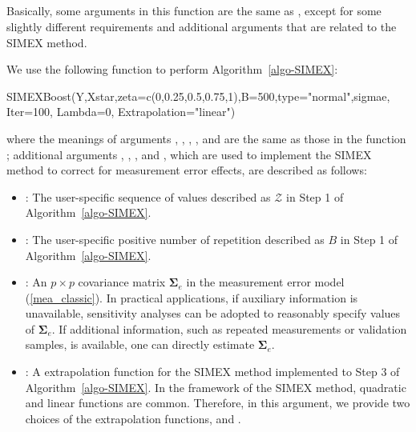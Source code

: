 
\subsection*{}

Basically, some arguments in this function are the same as , except for some slightly different requirements and additional arguments that are related to the SIMEX method.

We use the following function to perform Algorithm~\ref{algo-SIMEX}:
\begin{example}
        SIMEXBoost(Y,Xstar,zeta=c(0,0.25,0.5,0.75,1),B=500,type="normal",sigmae,
                   Iter=100, Lambda=0, Extrapolation="linear")
\end{example}
where the meanings of arguments , , , , and  are the same as those in the function ; additional arguments , , , and , which are used to implement the SIMEX method to correct for measurement error effects, are described as follows:

\begin{itemize}

    \item {}: The user-specific sequence of values described as $\mathcal{Z}$ in Step 1 of Algorithm~\ref{algo-SIMEX}.

    \item {}: The user-specific positive number of repetition described as $B$ in Step 1 of Algorithm~\ref{algo-SIMEX}.
    

    \item {}: An $p \times p$ covariance matrix $\boldsymbol{\Sigma}_e$ in the measurement error model (\ref{mea_classic}). In practical applications, if auxiliary information is unavailable, sensitivity analyses can be adopted to reasonably specify values of $\boldsymbol{\Sigma}_e$. If additional information, such as repeated measurements or validation samples, is available, one can directly estimate $\boldsymbol{\Sigma}_e$. 
    

    \item {}: A extrapolation function for the SIMEX method implemented to Step 3 of Algorithm~\ref{algo-SIMEX}. In the framework of the SIMEX method, quadratic and linear functions are common. Therefore, in this argument, we provide two choices of the extrapolation functions,  and . 

\end{itemize}

